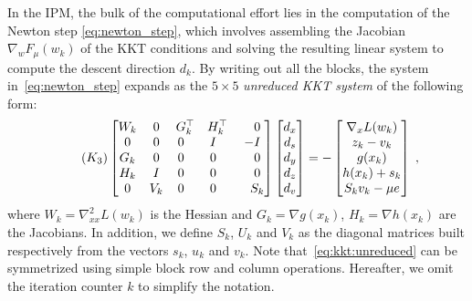 \documentclass[smallextended]{svjour3}
\begin{document}
In the IPM, the bulk of the computational effort lies in the computation of the Newton
step \eqref{eq:newton_step}, which involves assembling the Jacobian
$\nabla_w F_\mu(w_k)$ of the KKT conditions and solving the resulting linear system to compute
the descent direction $d_k$.
By writing out all the blocks, the system in~\eqref{eq:newton_step} expands as the $5 \times 5$
\emph{unreduced KKT system} of the following form:
\begin{equation}
  \label{eq:kkt:unreduced}
  \setlength\arraycolsep{5pt}
  \tag{$K_3$}
  \begin{bmatrix}
    W_k & 0   & G_k^\top         & H_k^\top         & \phantom{-}0 \\
    0   & 0   & 0\phantom{^\top} & I\phantom{^\top} & -I           \\
    G_k & 0   & 0\phantom{^\top} & 0\phantom{^\top} & \phantom{-}0 \\
    H_k & I   & 0\phantom{^\top} & 0\phantom{^\top} & \phantom{-}0 \\
    0   & V_k & 0\phantom{^\top} & 0\phantom{^\top} & \phantom{-}S_k
  \end{bmatrix}
  \begin{bmatrix}
    d_x \\
    d_s \\
    d_y \\
    d_z \\
    d_v
  \end{bmatrix}
  = - \begin{bmatrix}
    \nabla_x L(w_k) \\
       z_k - v_k  \\
       g(x_k)  \\
       h(x_k) + s_k  \\
       S_k v_k - \mu e
  \end{bmatrix} \; ,
\end{equation}
where $W_k = \nabla^2_{x x} L(w_k)$ is the Hessian and
$G_k = \nabla g(x_k)$, $H_k = \nabla h(x_k)$ are the Jacobians.
In addition, we define $S_k$, $U_k$ and $V_k$ as the diagonal matrices built respectively
from the vectors $s_k$, $u_k$ and $v_k$.
Note that~\eqref{eq:kkt:unreduced} can be symmetrized using simple block row and column operations.
Hereafter, we omit the iteration counter $k$ to simplify the notation.
\end{document}
